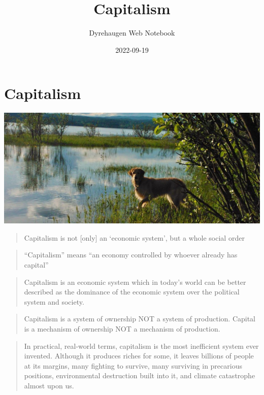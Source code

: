 \documentclass[
]{book}
\title{Capitalism}
\author{Dyrehaugen Web Notebook}
\date{2022-09-19}
\begin{document}
\maketitle

{
\setcounter{tocdepth}{1}
\tableofcontents
}
\hypertarget{capitalism}{%
\chapter{Capitalism}\label{capitalism}}

\includegraphics{fig/zelda.jpg}

\begin{quote}
Capitalism is not {[}only{]} an `economic system', but a whole social order
\end{quote}

\begin{quote}
``Capitalism'' means ``an economy controlled by whoever already has capital''
\end{quote}

\begin{quote}
Capitalism is an economic system which in today's world can be better described as the dominance of the economic system over the political system and society.
\end{quote}

\begin{quote}
Capitalism is a system of ownership NOT a system of production. Capital is a mechanism of ownership NOT a mechanism of production.
\end{quote}

\begin{quote}
In practical, real-world terms, capitalism is the most inefficient system ever invented. Although it produces riches for some, it leaves billions of people at its margins, many fighting to survive, many surviving in precarious positions, environmental destruction built into it, and climate catastrophe almost upon us.
\end{quote}
\end{document}

